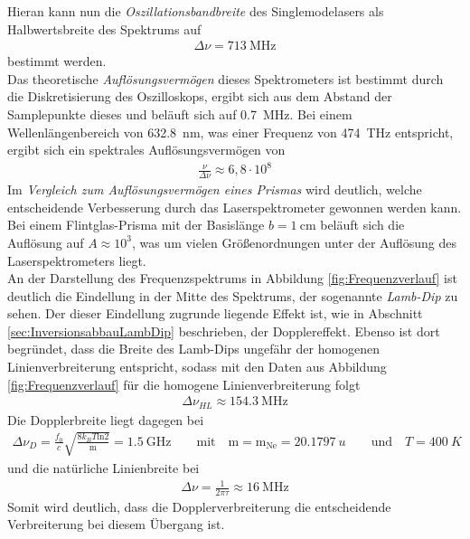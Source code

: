 \documentclass[a4paper,twoside,final]{article}
\begin{document}
Hieran kann nun die \textit{Oszillationsbandbreite} des Singlemodelasers als Halbwertsbreite des Spektrums auf
\begin{align}
  \Delta \nu = \SI{713}{\mega\hertz}
\end{align}
bestimmt werden.\\
Das theoretische \textit{Auflösungsvermögen} dieses Spektrometers ist bestimmt durch die Diskretisierung des Oszilloskops, ergibt sich aus dem Abstand der Samplepunkte dieses und beläuft sich auf \SI{0,7}{\mega\hertz}. Bei einem Wellenlängenbereich von \SI{632,8}{\nano\meter}, was einer Frequenz von \SI{474}{\tera\hertz} entspricht,  ergibt sich ein spektrales Auflösungsvermögen von
\begin{align}
  \frac{\nu}{\Delta\nu} \approx 6,8\cdot10^8
\end{align}
Im \textit{Vergleich zum Auflösungsvermögen eines Prismas} wird deutlich, welche entscheidende Verbesserung durch das Laserspektrometer gewonnen werden kann. Bei einem Flintglas-Prisma mit der Basislänge $b =\SI{1}{\centi\meter}$ beläuft sich die Auflösung auf $A \approx 10^3$, was um vielen Größenordnungen unter der Auflösung des Laserspektrometers liegt. \\
An der Darstellung des Frequenzspektrums in Abbildung \ref{fig:Frequenzverlauf} ist deutlich die Eindellung in der Mitte des Spektrums, der sogenannte \textit{Lamb-Dip} zu sehen. Der dieser Eindellung zugrunde liegende Effekt ist, wie in Abschnitt \ref{sec:InversionsabbauLambDip} beschrieben, der Dopplereffekt. Ebenso ist dort begründet, dass die Breite des Lamb-Dips ungefähr der homogenen Linienverbreiterung entspricht, sodass mit den Daten aus Abbildung \ref{fig:Frequenzverlauf} für die homogene Linienverbreiterung folgt
\begin{align}
  \Delta \nu_{HL} \approx \SI{154,3}{\mega \hertz}
\end{align}
Die Dopplerbreite liegt dagegen bei
\begin{align}
  \Delta \nu_{D}= \frac{f_0}{c} \sqrt{\frac{8 k_B T \text{ln} 2}{\text{m}}} = \SI{1,5}{\giga\hertz} \qquad \text{mit}\quad \text{m} = \text{m}_{\text{Ne}}
 = \SI{20,1797}{u} \qquad \text{und} \quad T= \SI{400}{K}
\end{align}
und die natürliche Linienbreite bei
\begin{align}
  \Delta \nu = \frac{1}{2\pi\tau}\approx \SI{16}{\mega\hertz}
\end{align}
Somit wird deutlich, dass die Dopplerverbreiterung die entscheidende Verbreiterung bei diesem Übergang ist.
\end{document}
